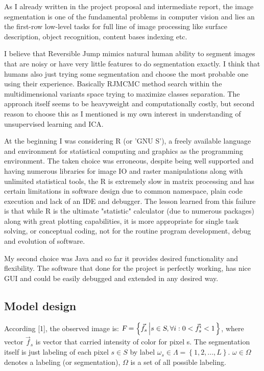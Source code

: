 \documentclass[journal]{IEEEtran}
\begin{document}
As I already written in the project proposal and intermediate report, the image segmentation is one of the fundamental problems in computer vision and lies an the first-row low-level tasks for full line of image processing like surface description, object recognition, content bases indexing etc. 

I believe that Reversible Jump mimics natural human ability to segment images that are noisy or have very little features to do segmentation exactly. I think that humans also just trying some segmentation and choose the most probable one using their experience. Basically RJMCMC method search within the multidimensional variants space trying to maximize classes separation. The approach itself seems to be heavyweight and computationally costly, but second reason to choose this as I mentioned is my own interest in understanding of unsupervised learning and ICA. 

At the beginning I was considering R (or 'GNU S'), a freely available language and environment for statistical computing and graphics as the programming environment. The taken choice was erroneous, despite being well supported and having numerous libraries for image IO and raster manipulations along with unlimited statistical tools, the R is extremely slow in matrix processing and has certain limitations in software design due to common namespace, plain code execution and lack of an IDE and debugger. The lesson learned from this failure is that while R is the ultimate "statistic" calculator (due to numerous packages) along with great plotting capabilities, it is more appropriate for single task solving, or conceptual coding, not for the routine program development, debug and evolution of software.

My second choice was Java and so far it provides desired functionality and flexibility. The software that done for the project is perfectly working, has nice GUI and could be easily debugged and extended in any desired way.

\subsection{Model design}
According [1], the observed image is: $\textsl{F} = \left\{ \vec{f}_{s} \left| s \in \textsl{S}, \forall i : 0 < \vec{f}^{i}_{s} < 1 \right. \right\}$,
where vector $\vec{f}_{s}$ is vector that carried intensity of color for pixel s. The segmentation itself is just labeling of each pixel $s \in S$ by label $\omega_{s} \in \Lambda = \left\{ 1,2,...,L \right\}$. $\omega\in\Omega$ denotes a labeling (or segmentation), $\Omega$ is a set of all possible labeling.
\end{document}
